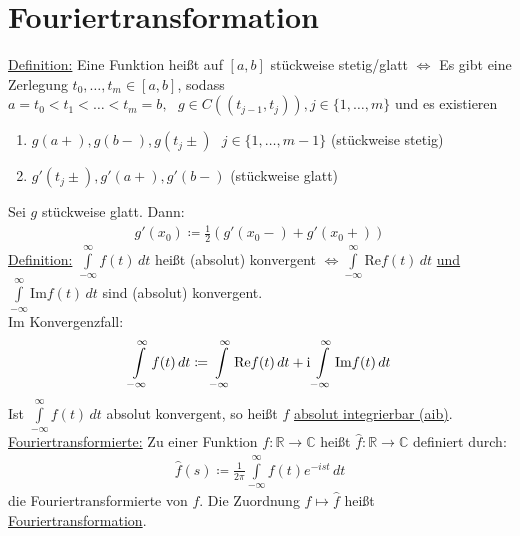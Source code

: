 \section{Fouriertransformation}
\underline{Definition:} Eine Funktion heißt auf $[a,b]$ stückweise stetig/glatt $\Leftrightarrow$ Es gibt eine Zerlegung $t_0, \ldots, t_m \in [a,b]$,
sodass $a=t_0 < t_1 < \ldots < t_m=b, \text{ } g \in C((t_{j-1},t_j)), j \in \{ 1, \ldots,m\}$ und es existieren
\begin{enumerate}
    \item $g(a+),g(b-),g(t_j\pm) \text{ } j \in \{ 1, \ldots, m-1\}$ (stückweise stetig)
    \item $g'(t_j \pm), g'(a+),g'(b-)$ (stückweise glatt)
\end{enumerate}
Sei $g$ stückweise glatt. Dann:
\begin{align*}
    g'(x_0) \coloneqq \frac{1}{2} (g'(x_0-) + g'(x_0+))
\end{align*}
\underline{Definition:} $\int \limits_{-\infty}^{\infty} f(t)\,dt$ heißt (absolut) konvergent $\Leftrightarrow \int \limits_{-\infty}^{\infty} \text{Re}f(t)\,dt$ 
\underline{und} $\int \limits_{-\infty}^{\infty} \text{Im}f(t)\,dt$ sind (absolut) konvergent. \\
Im Konvergenzfall: 
\begin{align*}
    \int \limits_{-\infty}^\infty f(t)\,dt \coloneqq  \int \limits_{-\infty}^\infty \text{Re} f(t)\,dt +  \text{i} \int \limits_{-\infty}^\infty \text{Im} f(t)\,dt
\end{align*} 
Ist $ \int \limits_{-\infty}^\infty f(t)\,dt$ absolut konvergent, so heißt $f$ \underline{absolut integrierbar (aib)}. \\
\underline{Fouriertransformierte:}
Zu einer Funktion $f: \mathbb{R} \to \mathbb{C}$ heißt $\widehat{f}:\mathbb{R} \to \mathbb{C}$ definiert durch:
\begin{align*}
    \widehat{f}(s) \coloneqq \frac{1}{2\pi} \int \limits_{-\infty}^\infty f(t) e^{-ist}\,dt
\end{align*}
die Fouriertransformierte von $f$. Die Zuordnung $f \mapsto \widehat{f}$ heißt \underline{Fouriertransformation}.

